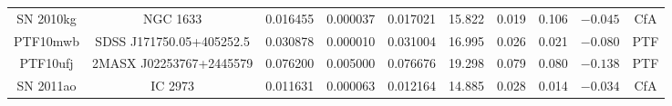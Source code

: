 \begin{tabular}{|c|c|cc|c|cc|c|c|c|}
SN 2010kg                  & NGC 1633                         &  0.016455 &  0.000037 &  0.017021 & 15.822 & 0.019 &  0.106  & $-0.045$ & CfA  \\
PTF10mwb                   & SDSS J171750.05+405252.5         &  0.030878 &  0.000010 &  0.031004 & 16.995 & 0.026 &  0.021  & $-0.080$ & PTF  \\
PTF10ufj                   & 2MASX J02253767+2445579          &  0.076200 &  0.005000 &  0.076676 & 19.298 & 0.079 &  0.080  & $-0.138$ & PTF  \\
SN 2011ao                  & IC 2973                          &  0.011631 &  0.000063 &  0.012164 & 14.885 & 0.028 &  0.014  & $-0.034$ & CfA  \\
\hline
\end{tabular}

